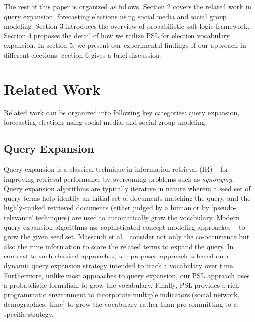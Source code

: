 The rest of this paper is organized as follows. Section 2 covers the related work in query expansion, forecasting elections using social media and social group modeling. Section 3 introduces the overview of probabilistic soft logic framework. Section 4 proposes the detail of how we utilize PSL for election vocabulary expansion. In section 5, we present our experimental findings of our approach in different elections. Section 6 gives a brief discussion.  

\section{Related Work}
Related work can be organized into following key categories: query expansion, forecasting elections using social media,
and social group modeling.
\begin{comment}
\reviews{refer\\
Dongsheng Duan, Yuhua Li, Ruixuan Li, Rui Zhang, and Aiming Wen. 2012. RankTopic: Ranking Based Topic Modeling. In Proceedings of the 2012 IEEE 12th International Conference on Data Mining (ICDM 12) [This work also captures relational information] ; Daniel Ramage, Susan T. Dumais, and Daniel J. Liebling. ICWSM, The AAAI Press, (2010); Castella, Quim and Sutton, Charles A Word Storms: Multiples of Word Clouds for Visual Comparison of Documents. CoRR abs/1301.0503 (2013)\\
Lau, Jey Han, Nigel Collier and Timothy Baldwin (2012) On-line Trend Analysis with Topic Models: hashtag twitter trends detection topic model online, In Proceedings of the 24th International Conference on Computational Linguistics (COLING 2012)
}
\end{comment}

\subsection{Query Expansion}
Query expansion is a classical technique in information retrieval (IR) ~\cite{manning2008introduction} for improving
retrieval performance by overcoming problems such as {\it synonymy}. Query expansion algorithms
are typically iterative in nature wherein a seed set of query terms help identify an initial set
of documents matching the query, and the highly-ranked retrieved documents (either judged by a human
or by `pseudo-relevance' techniques) are used to automatically grow the vocabulary. Modern
query expansion algorithms use sophisticated concept modeling approaches ~\cite{metzler2007latent}
to grow the given seed set. Massoudi et al.~\cite{massoudi2011incorporating} consider not only the co-occurrence but also the time information to score the related terms to expand the query.  
In contrast to such classical approaches,
our proposed approach is based on a dynamic query expansion strategy  intended to track a vocabulary
over time. Furthermore, unlike most approaches to query expansion, our PSL approach uses a probabilistic formalism
to grow the vocabulary. Finally, PSL provides a rich programmatic environment to incorporate 
multiple indicators (social network, demographics, time) to grow the vocabulary rather than pre-committing to a 
specific strategy.

